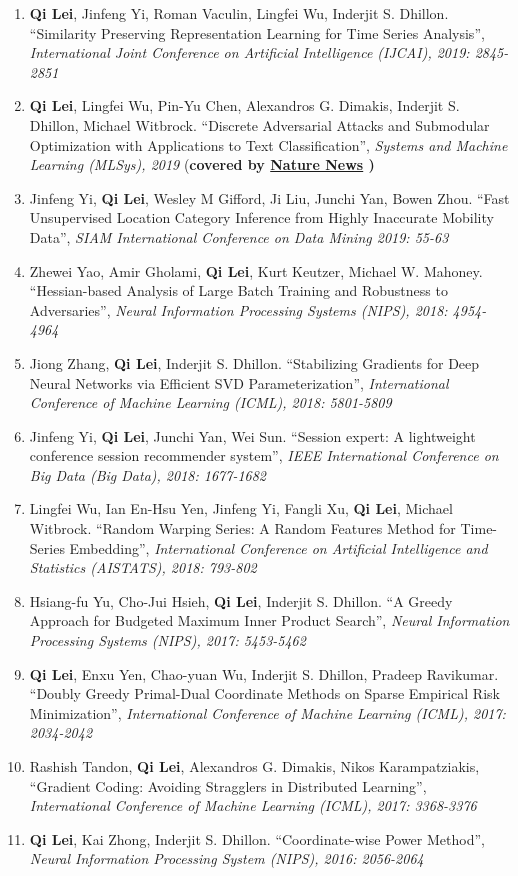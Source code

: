 \documentclass[margin, 10pt]{res} %
\begin{document}
\begin{resume}
\begin{enumerate}
  \item{ \textbf{Qi Lei}, Jinfeng Yi, Roman Vaculin, Lingfei Wu, Inderjit S. 
      Dhillon. ``Similarity Preserving Representation Learning for Time Series 
      Analysis'', \textit{International Joint Conference on Artificial 
    Intelligence (IJCAI), 2019: 2845-2851}}
  \item{\textbf{Qi Lei}, Lingfei Wu, Pin-Yu Chen, Alexandros G. Dimakis, Inderjit S. 
    Dhillon, Michael Witbrock. ``Discrete Adversarial Attacks and Submodular 
    Optimization with Applications to Text Classification'', \textit{Systems and Machine 
  Learning (MLSys), 2019} (\textbf{covered by \href{https://www.nature.com/articles/d41586-019-01510-1}{Nature News} )  } }
\item{Jinfeng Yi, \textbf{Qi Lei}, Wesley M Gifford, Ji Liu, Junchi Yan, Bowen Zhou. ``Fast Unsupervised Location Category Inference from Highly Inaccurate Mobility Data'', \textit{SIAM International Conference on Data Mining 2019: 55-63}}
\item{Zhewei Yao, Amir Gholami, \textbf{Qi Lei}, Kurt Keutzer, Michael W. 
  Mahoney. ``Hessian-based Analysis of Large Batch Training and Robustness to 
Adversaries'', \textit{Neural Information Processing Systems (NIPS), 2018: 4954-4964}}
  \item{Jiong Zhang, \textbf{Qi Lei}, Inderjit S. Dhillon. 
        ``Stabilizing Gradients for Deep 
       Neural Networks via Efficient SVD Parameterization'', \textit{
    International Conference of Machine Learning (ICML), 2018: 5801-5809}}
\item{Jinfeng Yi, \textbf{Qi Lei}, Junchi Yan, Wei Sun. ``Session expert: A lightweight conference session recommender system'', \textit{IEEE International Conference on Big Data (Big Data), 2018: 1677-1682}}
  \item{Lingfei Wu, Ian En-Hsu Yen, Jinfeng Yi, Fangli Xu, \textbf{Qi Lei}, Michael Witbrock.
    ``Random Warping Series: A Random Features Method for Time-Series Embedding'', \textit{International Conference on Artificial Intelligence and Statistics (AISTATS), 2018: 793-802}}
\item{Hsiang-fu Yu, Cho-Jui Hsieh, \textbf{Qi Lei}, Inderjit S. Dhillon. 
      ``A Greedy Approach for Budgeted Maximum 
      Inner Product Search'', \textit{Neural Information Processing Systems 
      (NIPS), 2017: 5453-5462}}
    \item{\textbf{Qi Lei}, Enxu Yen, Chao-yuan Wu, Inderjit S. Dhillon, Pradeep 
        Ravikumar. ``Doubly Greedy Primal-Dual Coordinate Methods on Sparse Empirical 
  Risk Minimization'', \textit{International Conference of Machine 
    Learning (ICML), 2017: 2034-2042}}
\item{Rashish Tandon, \textbf{Qi Lei}, 
    Alexandros G. Dimakis, Nikos Karampatziakis, ``Gradient Coding: Avoiding 
    Stragglers in Distributed Learning'', \textit{International Conference of 
  Machine Learning (ICML), 2017: 3368-3376}}
  \item {\textbf{Qi Lei},
      Kai Zhong, Inderjit S. Dhillon. ``Coordinate-wise Power Method'', 
  \textit{Neural Information Processing System (NIPS), 2016: 2056-2064}}		


\end{enumerate}
\end{resume}
\end{document}

